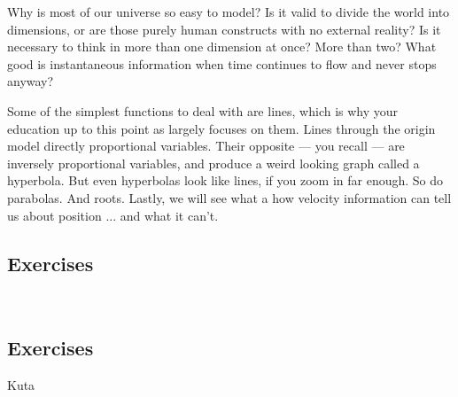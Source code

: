 

Why is most of our universe so easy to model?  
Is it valid to divide the world into dimensions,
or are those purely human constructs with no external reality?  
Is it necessary to think in more 
than one dimension at once?  More than two?  
What good is instantaneous information when 
time continues to flow and never stops anyway?

Some of the simplest functions to deal with are lines, which is why your education
up to this point as largely focuses on them.  Lines through the origin model directly
proportional variables.  Their opposite --- you recall --- are inversely proportional
variables, and produce a weird looking graph called a hyperbola.  But even hyperbolas
look like lines, if you zoom in far enough.  So do parabolas.  And roots.  Lastly,
we will see what a how velocity information can tell us about position ...
and what it can't.

\newpage
\chapterminitoc


\newpage
{}

\newpage

\newpage
\subsection{Exercises}





\newpage
{}

\newpage

~\vfill
\newpage
\subsection{Exercises}
Kuta





\newpage
{}

\newpage

